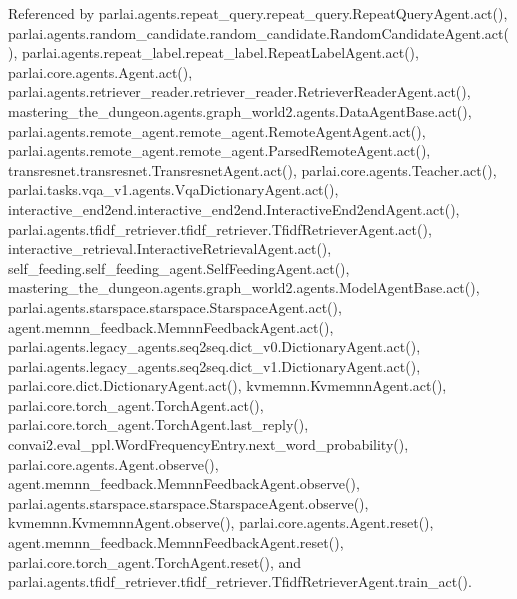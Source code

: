 Referenced by parlai.\+agents.\+repeat\+\_\+query.\+repeat\+\_\+query.\+Repeat\+Query\+Agent.\+act(), parlai.\+agents.\+random\+\_\+candidate.\+random\+\_\+candidate.\+Random\+Candidate\+Agent.\+act(), parlai.\+agents.\+repeat\+\_\+label.\+repeat\+\_\+label.\+Repeat\+Label\+Agent.\+act(), parlai.\+core.\+agents.\+Agent.\+act(), parlai.\+agents.\+retriever\+\_\+reader.\+retriever\+\_\+reader.\+Retriever\+Reader\+Agent.\+act(), mastering\+\_\+the\+\_\+dungeon.\+agents.\+graph\+\_\+world2.\+agents.\+Data\+Agent\+Base.\+act(), parlai.\+agents.\+remote\+\_\+agent.\+remote\+\_\+agent.\+Remote\+Agent\+Agent.\+act(), parlai.\+agents.\+remote\+\_\+agent.\+remote\+\_\+agent.\+Parsed\+Remote\+Agent.\+act(), transresnet.\+transresnet.\+Transresnet\+Agent.\+act(), parlai.\+core.\+agents.\+Teacher.\+act(), parlai.\+tasks.\+vqa\+\_\+v1.\+agents.\+Vqa\+Dictionary\+Agent.\+act(), interactive\+\_\+end2end.\+interactive\+\_\+end2end.\+Interactive\+End2end\+Agent.\+act(), parlai.\+agents.\+tfidf\+\_\+retriever.\+tfidf\+\_\+retriever.\+Tfidf\+Retriever\+Agent.\+act(), interactive\+\_\+retrieval.\+Interactive\+Retrieval\+Agent.\+act(), self\+\_\+feeding.\+self\+\_\+feeding\+\_\+agent.\+Self\+Feeding\+Agent.\+act(), mastering\+\_\+the\+\_\+dungeon.\+agents.\+graph\+\_\+world2.\+agents.\+Model\+Agent\+Base.\+act(), parlai.\+agents.\+starspace.\+starspace.\+Starspace\+Agent.\+act(), agent.\+memnn\+\_\+feedback.\+Memnn\+Feedback\+Agent.\+act(), parlai.\+agents.\+legacy\+\_\+agents.\+seq2seq.\+dict\+\_\+v0.\+Dictionary\+Agent.\+act(), parlai.\+agents.\+legacy\+\_\+agents.\+seq2seq.\+dict\+\_\+v1.\+Dictionary\+Agent.\+act(), parlai.\+core.\+dict.\+Dictionary\+Agent.\+act(), kvmemnn.\+Kvmemnn\+Agent.\+act(), parlai.\+core.\+torch\+\_\+agent.\+Torch\+Agent.\+act(), parlai.\+core.\+torch\+\_\+agent.\+Torch\+Agent.\+last\+\_\+reply(), convai2.\+eval\+\_\+ppl.\+Word\+Frequency\+Entry.\+next\+\_\+word\+\_\+probability(), parlai.\+core.\+agents.\+Agent.\+observe(), agent.\+memnn\+\_\+feedback.\+Memnn\+Feedback\+Agent.\+observe(), parlai.\+agents.\+starspace.\+starspace.\+Starspace\+Agent.\+observe(), kvmemnn.\+Kvmemnn\+Agent.\+observe(), parlai.\+core.\+agents.\+Agent.\+reset(), agent.\+memnn\+\_\+feedback.\+Memnn\+Feedback\+Agent.\+reset(), parlai.\+core.\+torch\+\_\+agent.\+Torch\+Agent.\+reset(), and parlai.\+agents.\+tfidf\+\_\+retriever.\+tfidf\+\_\+retriever.\+Tfidf\+Retriever\+Agent.\+train\+\_\+act().

\mbox{\label{classparlai_1_1agents_1_1retriever__reader_1_1retriever__reader_1_1RetrieverReaderAgent_a5ebf10c780f576b8e6b481a207a3b6ce}} 
